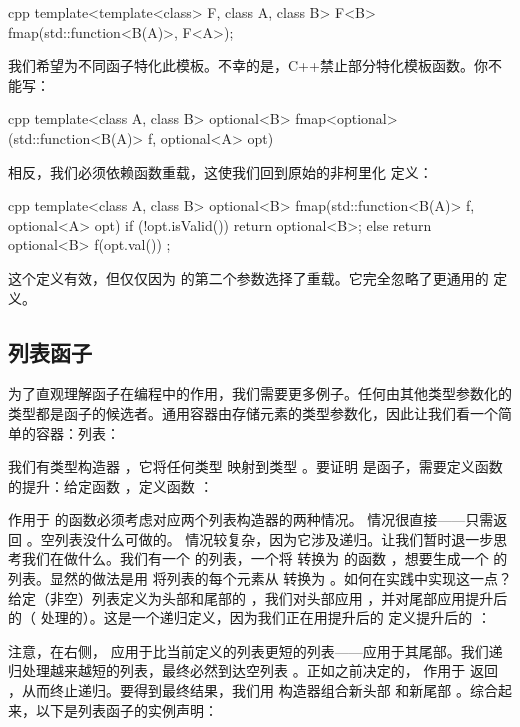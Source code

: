\begin{snip}{cpp}
template<template<class> F, class A, class B>
F<B> fmap(std::function<B(A)>, F<A>);
\end{snip}
我们希望为不同函子特化此模板。不幸的是，C++禁止部分特化模板函数。你不能写：

\begin{snip}{cpp}
template<class A, class B>
optional<B> fmap<optional>(std::function<B(A)> f, optional<A> opt)
\end{snip}
相反，我们必须依赖函数重载，这使我们回到原始的非柯里化  定义：

\begin{snip}{cpp}
template<class A, class B>
optional<B> fmap(std::function<B(A)> f, optional<A> opt) {
    if (!opt.isValid())
        return optional<B>{};
    else
        return optional<B>{ f(opt.val()) };
}
\end{snip}
这个定义有效，但仅仅因为  的第二个参数选择了重载。它完全忽略了更通用的  定义。

\subsection{列表函子}

为了直观理解函子在编程中的作用，我们需要更多例子。任何由其他类型参数化的类型都是函子的候选者。通用容器由存储元素的类型参数化，因此让我们看一个简单的容器：列表：

我们有类型构造器 ，它将任何类型  映射到类型 。要证明  是函子，需要定义函数的提升：给定函数 ，定义函数 ：

作用于  的函数必须考虑对应两个列表构造器的两种情况。 情况很直接——只需返回 。空列表没什么可做的。 情况较复杂，因为它涉及递归。让我们暂时退一步思考我们在做什么。我们有一个  的列表，一个将  转换为  的函数 ，想要生成一个  的列表。显然的做法是用  将列表的每个元素从  转换为 。如何在实践中实现这一点？给定（非空）列表定义为头部和尾部的 ，我们对头部应用 ，并对尾部应用提升后的（ 处理的）。这是一个递归定义，因为我们正在用提升后的  定义提升后的 ：

注意，在右侧， 应用于比当前定义的列表更短的列表——应用于其尾部。我们递归处理越来越短的列表，最终必然到达空列表 。正如之前决定的， 作用于  返回 ，从而终止递归。要得到最终结果，我们用  构造器组合新头部  和新尾部 。综合起来，以下是列表函子的实例声明：

